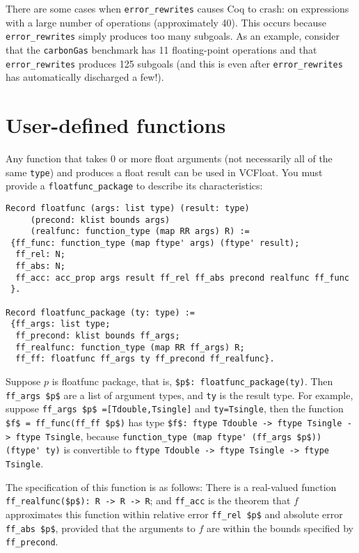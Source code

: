 \documentclass[article]{memoir}
\begin{document}
There are some cases when \lstinline{error_rewrites} causes Coq 
to crash: on expressions with a large number of operations 
(approximately 40). This occurs because 
\lstinline{error_rewrites} simply produces too many subgoals. 
As an example, consider that the 
\lstinline{carbonGas} benchmark has 11 floating-point 
operations and that \lstinline{error_rewrites} produces 125 
subgoals (and this is even after \lstinline{error_rewrites} has 
automatically discharged a few!). 

\newpage
\chapter{User-defined functions}
\label{userdefined}

Any function that takes 0 or more float arguments (not necessarily
all of the same \lstinline{type}) and produces a float result can be used
in VCFloat.  You must provide a \lstinline{floatfunc_package} to describe
its characteristics:

\begin{lstlisting}
Record floatfunc (args: list type) (result: type) 
     (precond: klist bounds args)
     (realfunc: function_type (map RR args) R) := 
 {ff_func: function_type (map ftype' args) (ftype' result);
  ff_rel: N;
  ff_abs: N;
  ff_acc: acc_prop args result ff_rel ff_abs precond realfunc ff_func
 }.

Record floatfunc_package (ty: type) :=
 {ff_args: list type;
  ff_precond: klist bounds ff_args;
  ff_realfunc: function_type (map RR ff_args) R;
  ff_ff: floatfunc ff_args ty ff_precond ff_realfunc}.
\end{lstlisting}
Suppose $p$ is floatfunc package, that is, \lstinline{$p$: floatfunc_package(ty)}.
Then \lstinline{ff_args $p$} are a list of argument types, and \lstinline{ty}
is the result type.  For example,
suppose \lstinline{ff_args $p$ =[Tdouble,Tsingle]} and \lstinline{ty=Tsingle},
then the function \lstinline{$f$ = ff_func(ff_ff $p$)} has type
\lstinline{$f$: ftype Tdouble -> ftype Tsingle -> ftype Tsingle},
because \lstinline{function_type (map ftype' (ff_args $p$)) (ftype' ty)}
is convertible to \lstinline{ftype Tdouble -> ftype Tsingle -> ftype Tsingle}.

The specification of this function is as follows:  There is a real-valued
function \lstinline{ff_realfunc($p$): R -> R -> R};
and \lstinline{ff_acc} is the theorem that
$f$ approximates this function within relative error \lstinline{ff_rel $p$}
and absolute error \lstinline{ff_abs $p$}, provided that the arguments
to $f$ are within the bounds specified by \lstinline{ff_precond}.
\end{document}

